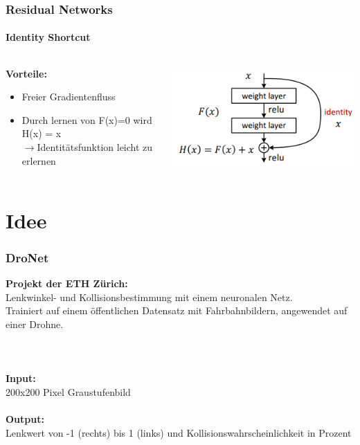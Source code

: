 \documentclass{beamer}
\begin{document}
\begin{frame}
\frametitle{Residual Networks}
\framesubtitle{Identity Shortcut}

\begin{columns}[T]

\begin{column}[T]{5cm}
\textbf{Vorteile:}\\
\begin{itemize}
\item{Freier Gradientenfluss}
\item{Durch lernen von F(x)=0 wird H(x) = x}\\
$\xrightarrow{}$Identitätsfunktion leicht zu erlernen
\end{itemize}


\end{column}

\begin{column}[T]{7cm}
	\includegraphics[scale=0.6]{figures/ResidualBlock.png}	 
\end{column}

\end{columns}
\end{frame}

\section{Idee}
\frame{\tableofcontents[currentsection]}

\begin{frame}
\frametitle{DroNet}
\textbf{Projekt der ETH Zürich:}\\
 Lenkwinkel- und Kollisionsbestimmung mit einem neuronalen Netz.\\
Trainiert auf einem öffentlichen Datensatz mit Fahrbahnbildern, angewendet auf einer Drohne.\\
\quad \\
\quad \\
\quad \\
\textbf{Input:}\\
200x200 Pixel Graustufenbild \\
\quad \\
\textbf{Output:}\\
Lenkwert von -1 (rechts) bis 1 (links) und Kollisionswahrscheinlichkeit in Prozent


\end{frame}
\end{document}
